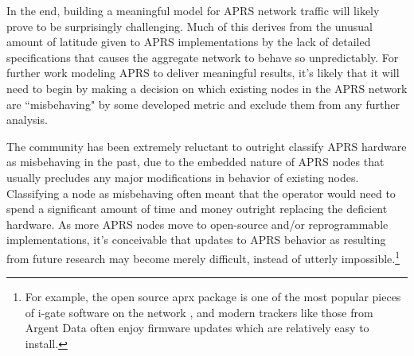 In the end, building a meaningful model for APRS network traffic will likely prove
to be surprisingly challenging.
Much of this derives from the unusual amount of latitude given to APRS implementations
by the lack of detailed specifications that causes the aggregate network to behave so
unpredictably.
For further work modeling APRS to deliver meaningful results,
it's likely that it will need to begin by making a decision on which existing nodes in the
APRS network are ``misbehaving" by some developed metric and exclude them from
any further analysis.

The community has been extremely reluctant to outright classify APRS hardware
as misbehaving in the past,
due to the embedded nature of APRS nodes that usually precludes any major
modifications in behavior of existing nodes.
Classifying a node as misbehaving often meant that the operator would need to
spend a significant amount of time and money outright replacing the deficient hardware.
As more APRS nodes move to open-source and/or reprogrammable implementations,
it's conceivable that updates to APRS behavior as resulting 
from future research may become merely difficult,
instead of utterly impossible.\footnote{For example, the open source aprx package is
	one of the most popular pieces of i-gate software on the network \cite{aprxpopular},
	and modern trackers like those from Argent Data often
enjoy firmware updates which are relatively easy to install.}

